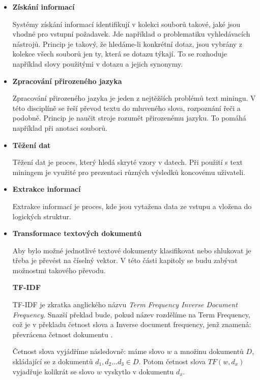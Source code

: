 \documentclass[thesis=M,czech]{FITthesis}[2012/10/20]
\begin{document}
		\begin{itemize} 

		\item \textbf{Získání informací}
		
			Systémy získání informací identifikují v kolekci souborů takové, jaké jsou vhodné pro vstupní požadavek. Jde například o problematiku vyhledávacích nástrojů. Princip je takový, že hledáme-li konkrétní dotaz, jsou vybrány z kolekce všech souborů jen ty, která se dotazu týkají. To se rozhoduje například slovy použitými v dotazu a jejich synonymy.
		
		\item \textbf{Zpracování přirozeného jazyka}
		
			Zpracování přirozeného jazyka je jeden z nejtěžších problémů text miningu. V této disciplíně se řeší převod textu do mluveného slova, rozpoznání řeči a podobně. Princip je naučit stroje rozumět přirozenému jazyku. To pomáhá například při anotaci souborů.
			
		\item \textbf{Těžení dat}
		
			Těžení dat je proces, který hledá skryté vzory v datech. Při použití s text miningem je využité pro prezentaci různých výsledků koncovému uživateli.
			
		\item \textbf{Extrakce informací}
		
			Extrakce informací je proces, kde jsou vytažena data ze vstupu a vložena do logických struktur.\cite{SankarSureshTextMining}
		
		
		\item \textbf{Transformace textových dokumentů}
		
		 Aby bylo možné jednotlivé textové dokumenty klasifikovat nebo shlukovat je třeba je převést na číselný vektor. V této části kapitoly se budu zabývat možnostmi takového převodu.
	
		\textbf{TF-IDF}
			\label{subsub:tf-idf}
			
			TF-IDF je zkratka anglického názvu \textit{Term Frequency Inverse Document Frequency}. Snazší překlad bude, pokud název rozdělíme na Term Frequency, což je v překladu četnost slova a Inverse document frequency, jenž znamená: převrácena četnost dokumentu \cite{RamosTF-IDF}.
			
			Četnost slova vyjádříme následovně: máme slovo $w$ a množinu dokumentů $D$, skládající se z dokumentů $d_1, d_2 \ldots d_3 \in D$. Potom četnost slova $TF(w, d_x)$ vyjadřuje kolikrát se slovo $w$ vyskytlo v dokumentu $d_x$.
			

\end{itemize}
\end{document}
